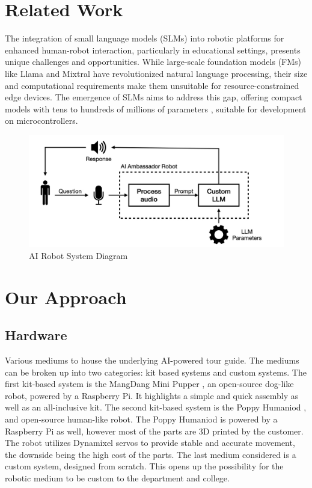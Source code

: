 \documentclass[conference]{IEEEtran}
\begin{document}
\section{Related Work}
The integration of small language models (SLMs) into robotic platforms for enhanced human-robot interaction, particularly in educational settings, presents unique challenges and opportunities.
While large-scale foundation models (FMs) like Llama \cite{b1} and Mixtral \cite{b2} have revolutionized natural language processing, their size and computational requirements make them unsuitable for resource-constrained edge devices. 
The emergence of SLMs aims to address this gap, offering compact models with tens to hundreds of millions of parameters \cite{b3}, suitable for development on microcontrollers. 

\begin{figure}[t]
    \centering
    \includegraphics[width=0.8\linewidth]{assets/diagram.001.jpeg}
    \caption{AI Robot System Diagram}
    \label{fig:system}
\end{figure}

\section{Our Approach}
\subsection{Hardware}
Various mediums to house the underlying AI-powered tour guide. The mediums can be broken up into two categories: kit based systems and custom systems.
The first kit-based system is the MangDang Mini Pupper \cite{b4}, an open-source dog-like robot, powered by a Raspberry Pi. It highlights a simple and quick assembly as well as an all-inclusive kit. 
The second kit-based system is the Poppy Humaniod \cite{b5}, and open-source human-like robot. The Poppy Humaniod is powered by a Raspberry Pi as well, however most of the parts are 3D printed by the customer. The robot utilizes Dynamixel servos to provide stable and accurate movement, the downside being the high cost of the parts.
The last medium considered is a custom system, designed from scratch. This opens up the possibility for the robotic medium to be custom to the department and college. 
\end{document}
